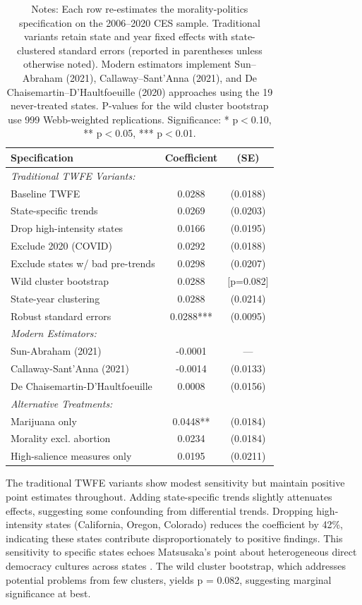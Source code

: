 \documentclass[12pt,letterpaper,oneside]{book}
\begin{document}
\begin{table}[H]
\centering
\caption{Comprehensive Robustness Checks}
\label{tab:robustness_full}
\caption*{\footnotesize Notes: Each row re-estimates the morality-politics specification on the 2006--2020 CES sample. Traditional variants retain state and year fixed effects with state-clustered standard errors (reported in parentheses unless otherwise noted). Modern estimators implement Sun--Abraham (2021), Callaway--Sant'Anna (2021), and De Chaisemartin--D'Haultfoeuille (2020) approaches using the 19 never-treated states. P-values for the wild cluster bootstrap use 999 Webb-weighted replications. Significance: * p$<$0.10, ** p$<$0.05, *** p$<$0.01.}
\small
\begin{tabular}{lcc}
\hline\hline
Specification & Coefficient & (SE) \\
\hline
\multicolumn{3}{l}{\textit{Traditional TWFE Variants:}} \\
Baseline TWFE & 0.0288 & (0.0188) \\
State-specific trends & 0.0269 & (0.0203) \\
Drop high-intensity states & 0.0166 & (0.0195) \\
Exclude 2020 (COVID) & 0.0292 & (0.0188) \\
Exclude states w/ bad pre-trends & 0.0298 & (0.0207) \\
Wild cluster bootstrap & 0.0288 & [p=0.082] \\
State-year clustering & 0.0288 & (0.0214) \\
Robust standard errors & 0.0288*** & (0.0095) \\
\hline
\multicolumn{3}{l}{\textit{Modern Estimators:}} \\
Sun-Abraham (2021) & -0.0001 & --- \\
Callaway-Sant'Anna (2021) & -0.0014 & (0.0133) \\
De Chaisemartin-D'Haultfoeuille & 0.0008 & (0.0156) \\
\hline
\multicolumn{3}{l}{\textit{Alternative Treatments:}} \\
Marijuana only & 0.0448** & (0.0184) \\
Morality excl. abortion & 0.0234 & (0.0184) \\
High-salience measures only & 0.0195 & (0.0211) \\
\hline\hline
\end{tabular}
\end{table}

The traditional TWFE variants show modest sensitivity but maintain positive point estimates throughout. Adding state-specific trends slightly attenuates effects, suggesting some confounding from differential trends. Dropping high-intensity states (California, Oregon, Colorado) reduces the coefficient by 42\%, indicating these states contribute disproportionately to positive findings. This sensitivity to specific states echoes Matsusaka's point about heterogeneous direct democracy cultures across states \citep{matsusaka2018public}. The wild cluster bootstrap, which addresses potential problems from few clusters, yields p = 0.082, suggesting marginal significance at best.
\end{document}
